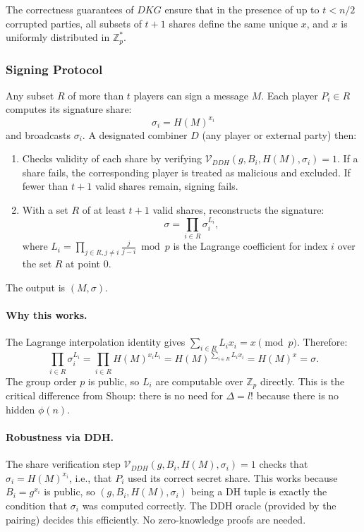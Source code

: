 The correctness guarantees of $DKG$ \cite{GJKR99} ensure that in the presence of up to
$t < n/2$ corrupted parties, all subsets of $t+1$ shares define the same unique $x$, and
$x$ is uniformly distributed in $\mathbb{Z}_p^*$.

\subsubsection{Signing Protocol}

Any subset $R$ of more than $t$ players can sign a message $M$. Each player $P_i \in R$
computes its signature share:
\[
    \sigma_i = H(M)^{x_i}
\]
and broadcasts $\sigma_i$. A designated combiner $D$ (any player or external party) then:

\begin{enumerate}
    \item Checks validity of each share by verifying
    $\mathcal{V}_{DDH}(g, B_i, H(M), \sigma_i) = 1$. If a share fails, the corresponding
    player is treated as malicious and excluded. If fewer than $t+1$ valid shares remain,
    signing fails.
    \item With a set $R$ of at least $t+1$ valid shares, reconstructs the signature:
    \[
        \sigma = \prod_{i \in R} \sigma_i^{L_i},
    \]
    where $L_i = \prod_{j \in R, j \neq i} \frac{j}{j - i} \bmod p$ is the Lagrange
    coefficient for index $i$ over the set $R$ at point $0$.
\end{enumerate}

The output is $(M, \sigma)$.

\paragraph{Why this works.} The Lagrange interpolation identity gives
$\sum_{i \in R} L_i x_i = x \pmod{p}$. Therefore:
\[
    \prod_{i \in R} \sigma_i^{L_i} = \prod_{i \in R} H(M)^{x_i L_i} =
    H(M)^{\sum_{i \in R} L_i x_i} = H(M)^x = \sigma.
\]
The group order $p$ is public, so $L_i$ are computable over $\mathbb{Z}_p$ directly.
This is the critical difference from Shoup: there is no need for $\Delta = l!$ because
there is no hidden $\phi(n)$.

\paragraph{Robustness via DDH.} The share verification step
$\mathcal{V}_{DDH}(g, B_i, H(M), \sigma_i) = 1$ checks that $\sigma_i = H(M)^{x_i}$,
i.e., that $P_i$ used its correct secret share. This works because $B_i = g^{x_i}$ is
public, so $(g, B_i, H(M), \sigma_i)$ being a DH tuple is exactly the condition that
$\sigma_i$ was computed correctly. The DDH oracle (provided by the pairing) decides this
efficiently. No zero-knowledge proofs are needed.

